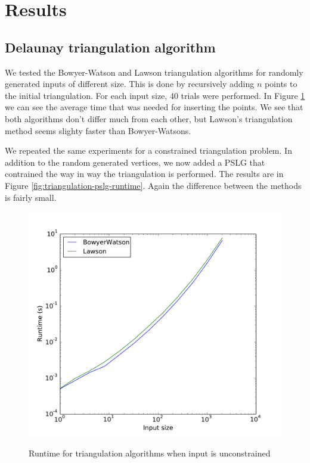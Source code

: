 \section{Results}
\label{sec:results}

\subsection{Delaunay triangulation algorithm}
\label{sub:triangulation}

We tested the Bowyer-Watson and Lawson triangulation algorithms for randomly generated inputs of different size.
This is done by recursively adding $n$ points to the initial triangulation.
For each input size, 40 trials were performed.
In Figure \ref{fig:triangulation-runtime} we can see the average time that was needed for inserting the points.
We see that both algorithms don't differ much from each other, but Lawson's triangulation method seems slighty faster than Bowyer-Watsons.

We repeated the same experiments for a constrained triangulation problem.
In addition to the random generated vertices, we now added a PSLG that contrained the way in way the triangulation is performed.
The results are in Figure \ref{fig:triangulation-pslg-runtime}.
Again the difference between the methods is fairly small.

\begin{figure}
    \includegraphics[width=\columnwidth]{../images/runtime.pdf}
    \label{fig:triangulation-runtime}
    \caption{Runtime for triangulation algorithms when input is unconstrained}
\end{figure}

